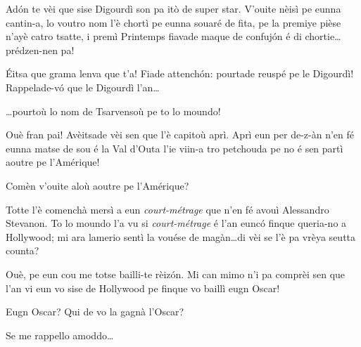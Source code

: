 \begin{drama}



\scene[-- Hollywood]

\Nevaouspeaks Ad\'on te vèi que sise Digourdì son pa itò de super star. V'ouite nèisì pe eunna cantin-a, lo voutro nom l'è chortì pe eunna souaré de fita, pe la premiye pièse n'ayè catro tsatte, i premì Printemps fiavade  maque de confuj\'on é di chortie\ldots prédzen-nen pa!

\Paganspeaks \'Eitsa que grama lenva que t'a! Fiade attench\'on: pourtade reuspé pe le Digourdì! Rappelade-v\'o  que le Digourdì l'an\ldots

\Ledouspeaks \ldots pourtoù lo nom de Tsarvensoù pe to lo moundo!

\Paganspeaks Ouè fran pai! Avèitsade vèi sen que l'è capitoù aprì. Aprì eun per de-z-àn n'en fé eunna matse de sou é la Val d’Outa l'ie viin-a tro petchouda pe no é sen partì aoutre pe l’Amérique!

\Nevaousaspeaks Comèn v'ouite aloù aoutre pe l’Amérique?

\Paganspeaks  Totte l'è comenchà mersì a eun \textit{court-métrage} que n'en fé avouì Alessandro Stevanon. To lo moundo l'a vu si \textit{court-métrage} é l'an euncó finque queria-no a Hollywood; mi ara lamerio sentì la vouése de magàn\ldots di vèi se l'è pa vrèya seutta counta?

\Maganspeaks Ouè, pe eun cou me totse bailli-te rèiz\'on. Mi can mimo n'i pa comprèi sen que l'an vi eun vo sise de Hollywood pe finque vo baillì eugn Oscar!

\Nevaousaspeaks Eugn Oscar? Qui de vo la gagnà l’Oscar?

\Paganspeaks Se me rappello amoddo\ldots






\end{drama}
